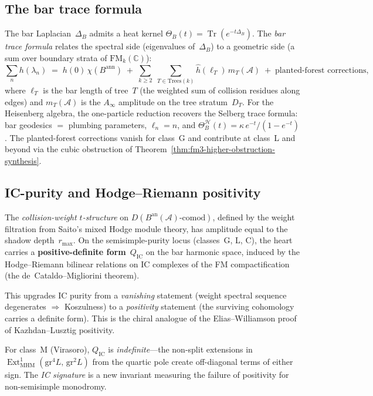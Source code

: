\documentclass[11pt]{article}
\newcommand{\cA}{\mathcal{A}}
\newcommand{\cH}{\mathcal{H}}
\newcommand{\FM}{\mathrm{FM}}
\newcommand{\Ext}{\operatorname{Ext}}
\newcommand{\Tr}{\operatorname{Tr}}
\providecommand{\bC}{\mathbb{C}}
\begin{document}
\subsection{The bar trace formula}
\label{sec:bar-trace-formula}

The bar Laplacian~$\Delta_B$ admits a heat kernel
$\Theta_B(t) = \Tr(e^{-t\Delta_B})$.
The \emph{bar trace formula} relates the spectral side
(eigenvalues of~$\Delta_B$) to a geometric side (a sum
over boundary strata of $\FM_k(\bC)$):
\[
  \sum_n h(\lambda_n)
  \;=\;
  h(0)\,\chi(B^{\mathrm{ann}})
  \;+\;
  \sum_{k \geq 2}\;
  \sum_{T \in \mathrm{Trees}(k)}
  \hat{h}(\ell_T)\, m_T(\cA)
  \;+\;
  \text{planted-forest corrections},
\]
where $\ell_T$ is the bar length of tree~$T$ (the
weighted sum of collision residues along edges)
and $m_T(\cA)$ is the $A_\infty$ amplitude on the
tree stratum~$D_T$.  For the Heisenberg algebra,
the one-particle reduction recovers the Selberg trace
formula: bar geodesics $=$ plumbing parameters,
$\ell_n = n$, and
$\Theta_B^{\cH}(t) = \kappa\, e^{-t}/(1 - e^{-t})$.
The planted-forest corrections vanish for class~G
and contribute at class~L and beyond via the cubic
obstruction of Theorem~\ref{thm:fm3-higher-obstruction-synthesis}.

\subsection{IC-purity and Hodge--Riemann positivity}
\label{sec:ic-purity-positivity}

The \emph{collision-weight $t$-structure} on
$D(B^{\mathrm{an}}(\cA)\text{-comod})$, defined by the
weight filtration from Saito's mixed Hodge module theory,
has amplitude equal to the shadow depth~$r_{\max}$.  On the
semisimple-purity locus (classes~G, L, C), the heart carries
a \textbf{positive-definite form}~$Q_{\mathrm{IC}}$ on the
bar harmonic space, induced by the Hodge--Riemann bilinear
relations on IC complexes of the FM compactification
(the de~Cataldo--Migliorini theorem).

This upgrades IC purity from a \emph{vanishing} statement
(weight spectral sequence degenerates $\Rightarrow$
Koszulness) to a \emph{positivity} statement (the surviving
cohomology carries a definite form).  This is the chiral
analogue of the Elias--Williamson proof of Kazhdan--Lusztig
positivity.

For class~M (Virasoro), $Q_{\mathrm{IC}}$ is
\emph{indefinite}---the non-split extensions in
$\Ext^1_{\mathrm{MHM}}(\mathrm{gr}^4 L,\, \mathrm{gr}^2 L)$
from the quartic pole create off-diagonal terms of either sign.
The \emph{IC signature} is a new invariant measuring the
failure of positivity for non-semisimple monodromy.
\end{document}

